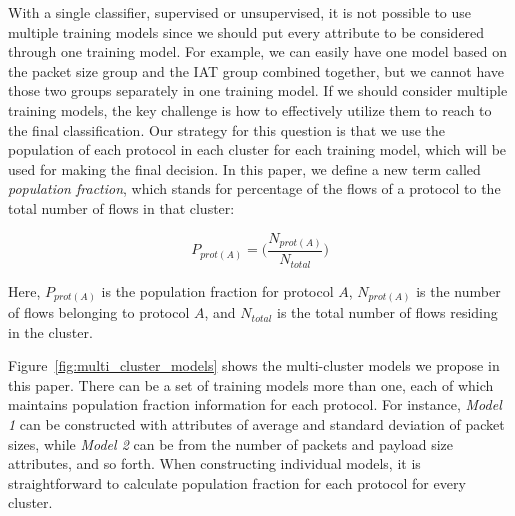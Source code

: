 \documentclass[conference]{IEEEtran}
\begin{document}
With a single classifier, supervised or unsupervised, it is not possible to use multiple training models since we should put every attribute to be considered through one training model. For example, we can easily have one model based on the packet size group and the IAT group combined together, but we cannot have those two groups separately in one training model. 
If we should consider multiple training models, the key challenge is how to effectively utilize them  to reach to the final classification.
Our strategy for this question is that we use the population of each protocol in each cluster for each training model, which will be used for making the final decision.
In this paper, we define a new term called \emph{population fraction}, 
which stands for percentage of the flows of a protocol to the total number of flows in that cluster:

\begin{equation}
P_{prot(A)} = \Big( \frac{N_{prot(A)}}{N_{total}} \Big)
\end{equation}

Here, $P_{prot(A)}$ is the population fraction for protocol $A$, $N_{prot(A)}$ is the number of flows belonging to protocol $A$, and $N_{total}$ is the total number of flows residing in the cluster.

Figure~\ref{fig:multi_cluster_models} shows the multi-cluster models we propose in this paper. 
There can be a set of training models more than one, each of which maintains population fraction information for each protocol. %
For instance, \emph{Model 1} can be constructed with attributes of average and standard deviation of packet sizes, while \emph{Model 2} can be from the number of packets and payload size attributes, and so forth.
When constructing individual models, it is straightforward to calculate population fraction  for each protocol for every cluster.
\end{document}
